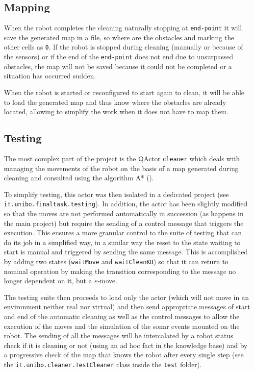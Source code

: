 \subsection{Mapping}
When the robot completes the cleaning naturally stopping at \texttt{end-point} it will save the generated map in a file, so where are the obstacles and marking the other cells as \texttt{0}. If the robot is stopped during cleaning (manually or because of the sensors) or if the end of the \texttt{end-point} does not end due to unsurpassed obstacles, the map will not be saved because it could not be completed or a situation has occurred sudden.

When the robot is started or reconfigured to start again to clean, it will be able to load the generated map and thus know where the obstacles are already located, allowing to simplify the work when it does not have to map them.

\subsection{Testing}
The most complex part of the project is the QActor \texttt{cleaner} which deals with managing the movements of the robot on the basis of a map generated during cleaning and consulted using the algorithm A* ().

To simplify testing, this actor was then isolated in a dedicated project (see \texttt{it.unibo.finaltask.testing}). In addition, the actor has been slightly modified so that the moves are not performed automatically in succession (as happens in the main project) but require the sending of a control message that triggers the execution. This ensures a more granular control to the suite of testing that can do its job in a simplified way, in a similar way the reset to the state waiting to start is manual and triggered by sending the same message. This is accomplished by adding two states (\texttt{waitMove} and \texttt{waitCleanKB}) so that it can return to nominal operation by making the transition corresponding to the message no longer dependent on it, but a $\varepsilon$-move.

The testing suite then proceeds to load only the actor (which will not move in an environment neither real nor virtual) and then send appropriate messages of start and end of the automatic cleaning as well as the control messages to allow the execution of the moves and the simulation of the sonar events mounted on the robot. The sending of all the messages will be intercalated by a robot status check if it is cleaning or not (using an ad hoc fact in the knowledge base) and by a progressive check of the map that knows the robot after every single step (see the \texttt{it.unibo.cleaner.TestCleaner} class inside the \texttt{test} folder).


